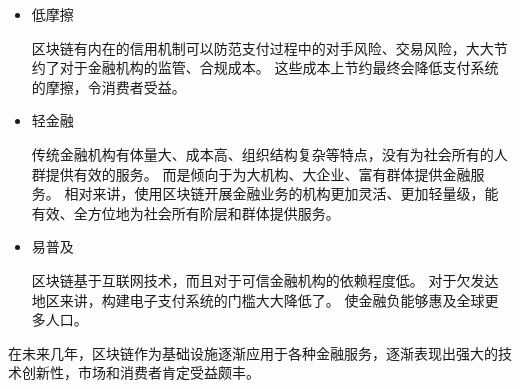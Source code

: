 \begin{itemize}
    \item 低摩擦
    
    区块链有内在的信用机制可以防范支付过程中的对手风险、交易风险，大大节约了对于金融机构的监管、合规成本。
    这些成本上节约最终会降低支付系统的摩擦，令消费者受益。
    
    \item 轻金融
    
    传统金融机构有体量大、成本高、组织结构复杂等特点，没有为社会所有的人群提供有效的服务。
    而是倾向于为大机构、大企业、富有群体提供金融服务。
    相对来讲，使用区块链开展金融业务的机构更加灵活、更加轻量级，能有效、全方位地为社会所有阶层和群体提供服务。
    
    \item 易普及
    
    区块链基于互联网技术，而且对于可信金融机构的依赖程度低。
    对于欠发达地区来讲，构建电子支付系统的门槛大大降低了。
    使金融负能够惠及全球更多人口。
   
\end{itemize}

在未来几年，区块链作为基础设施逐渐应用于各种金融服务，逐渐表现出强大的技术创新性，市场和消费者肯定受益颇丰。

